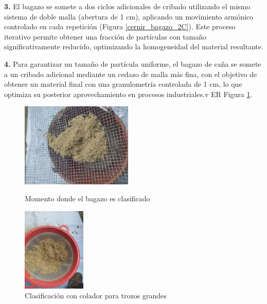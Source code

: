 \documentclass[12pt]{article}
\begin{document}
			
			
			
			
			\textbf{3.}	El bagazo se somete a dos ciclos adicionales de cribado utilizando el mismo sistema de doble malla (abertura de 1 cm), aplicando un movimiento armónico controlado en cada repetición (Figura \ref{cernir_bagazo_2C}). Este proceso iterativo permite obtener una fracción de partículas con tamaño significativamente reducido, optimizando la homogeneidad del material resultante.
			
			
			\textbf{4.} Para garantizar un tamaño de partícula uniforme, el bagazo de caña se somete a un cribado adicional mediante un cedazo de malla más fina, con el objetivo de obtener un material final con una granulometría controlada de 1 cm, lo que optimiza su posterior aprovechamiento en procesos industriales.v	ER Figura \ref{cernir_bagazo_cedazo}.
		
		
			\begin{figure}[H]
			\centering
			\begin{minipage}{0.46\textwidth}
				\centering
			\includegraphics[width=\linewidth, height=4cm, keepaspectratio]{imagenes/cernir_bagazo_2}
			\caption{Momento donde el bagazo es clasificado}
			\label{cernir_bagazo_2C}
			\end{minipage}
			\hfill
			\begin{minipage}{0.48\textwidth}
				\centering
				\includegraphics[width=\linewidth, height=4cm, keepaspectratio]{imagenes/cernir_bagazo_cedazo}
				\caption{Clasificación con colador para trozos grandes}
				\label{cernir_bagazo_cedazo}
			\end{minipage}
		\end{figure}
		
\end{document}
